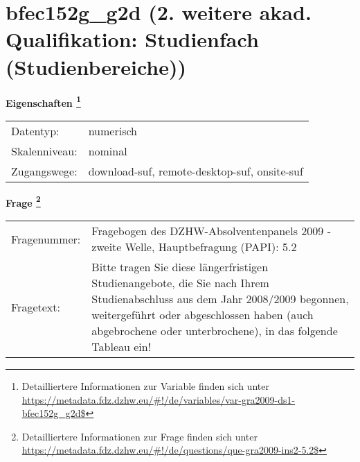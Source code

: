 
    \setcounter{footnote}{0}

    \vspace*{-1.8cm}
	\section{bfec152g\_g2d (2. weitere akad. Qualifikation: Studienfach (Studienbereiche))}
	\label{section:bfec152g_g2d}



    \vspace*{0.5cm}
    \noindent\textbf{Eigenschaften
	\footnote{Detailliertere Informationen zur Variable finden sich unter
		\url{https://metadata.fdz.dzhw.eu/\#!/de/variables/var-gra2009-ds1-bfec152g_g2d$}}}\\
	\begin{tabularx}{\hsize}{@{}lX}
	Datentyp: & numerisch \\
	Skalenniveau: & nominal \\
	Zugangswege: &
	  download-suf, 
	  remote-desktop-suf, 
	  onsite-suf
 \\
    \end{tabularx}



				\vspace*{0.5cm}
                \noindent\textbf{Frage
	                \footnote{Detailliertere Informationen zur Frage finden sich unter
		              \url{https://metadata.fdz.dzhw.eu/\#!/de/questions/que-gra2009-ins2-5.2$}}}\\
				\begin{tabularx}{\hsize}{@{}lX}
					Fragenummer: &
					  Fragebogen des DZHW-Absolventenpanels 2009 - zweite Welle, Hauptbefragung (PAPI):
					  5.2
 \\
					Fragetext: & Bitte tragen Sie diese längerfristigen Studienangebote, die Sie nach Ihrem Studienabschluss aus dem Jahr 2008/2009 begonnen, weitergeführt oder abgeschlossen haben (auch abgebrochene oder unterbrochene), in das folgende Tableau ein! \\
				\end{tabularx}





